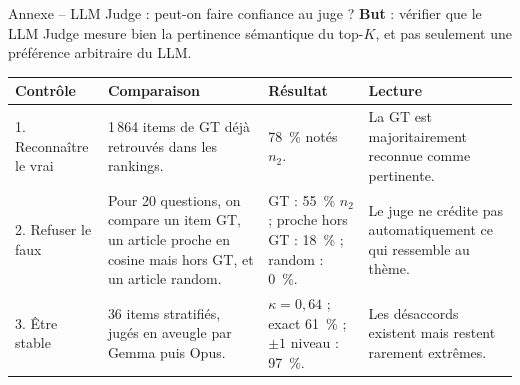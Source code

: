 \documentclass[aspectratio=169,10pt]{beamer}
\begin{document}
\begin{frame}{Annexe -- LLM Judge : peut-on faire confiance au juge ?}
  \footnotesize
  \textbf{But} : vérifier que le LLM Judge mesure bien la pertinence sémantique du top-$K$,
  et pas seulement une préférence arbitraire du LLM.

  \vspace{0.45em}
  \begin{center}
  \renewcommand{\arraystretch}{1.28}
  \setlength{\tabcolsep}{4pt}
  \begin{tabular}{@{}p{2.7cm} p{4.5cm} p{3.0cm} p{3.2cm}@{}}
    \toprule
    \textbf{Contrôle} & \textbf{Comparaison} & \textbf{Résultat} & \textbf{Lecture} \\
    \midrule
    1. Reconnaître le vrai &
    1\,864 items de GT déjà retrouvés dans les rankings. &
    78~\% notés $n_2$. &
    La GT est majoritairement reconnue comme pertinente. \\
    \midrule
    2. Refuser le faux &
    Pour 20 questions, on compare un item GT, un article proche en cosine mais hors GT,
    et un article random. &
    GT : 55~\% $n_2$ ; proche hors GT : 18~\% ; random : 0~\%. &
    Le juge ne crédite pas automatiquement ce qui ressemble au thème. \\
    \midrule
    3. Être stable &
    36 items stratifiés, jugés en aveugle par Gemma puis Opus. &
    $\kappa = 0{,}64$ ; exact 61~\% ; $\pm 1$ niveau : 97~\%. &
    Les désaccords existent mais restent rarement extrêmes. \\
    \bottomrule
  \end{tabular}
  \end{center}
\end{frame}
\end{document}

